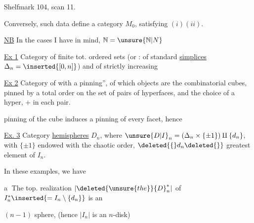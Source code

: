 Shelfmark 104, scan 11.

Conversely, such data define a category $M_0$, satisfying $(i)(ii)$.

\uline{NB} In the cases I have in mind, $\mathbb N=\unsure{\mathbb N|N}$

\uline{Ex 1} Category of finite tot. ordered sets (or : of standard \uline{simplices} $\Delta_n=\inserted{[0,n]}$) and of strictly increasing 

\uline{Ex 2} Category of   with a pinning'',  of which  objects are the  combinatorial cubes,
  pinned by a total order on the set of pairs of hyperfaces,  and the choice of a hyper,   $+$ in each pair.

 pinning of the cube induces a pinning of every facet, hence  

\uline{Ex. 3} Category   \uline{hemispheres} $D_n$, where $ {\unsure{D|I}}_n=(\Delta_n\times\{\pm1\})\amalg\{d_n\}$, with $\{\pm1\}$ endowed with the chaotic order, $\deleted{\{}d_n\deleted{\}}$  greatest element of $I_n$.

In  these  examples, we have

\textcircled{a}  The top. realization $|\deleted{\unsure{the}} {D}_n^*|$ of $I_n^*\inserted{=I_n\setminus\{d_n\}}$ is an 

 $(n-1)$ sphere, (hence $|I_n|$ is an $n$-disk)
